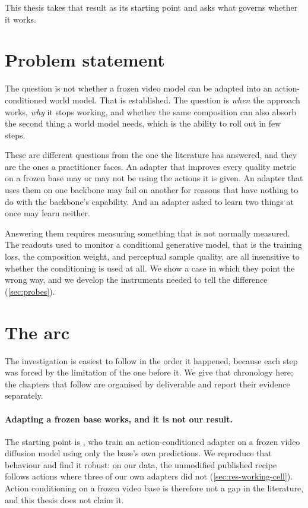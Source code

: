 This thesis takes that result as its starting point and asks what governs
whether it works.

\section{Problem statement}
\label{sec:problem}

The question is not whether a frozen video model can be adapted into an
action-conditioned world model. That is established. The question is
\emph{when} the approach works, \emph{why} it stops working, and whether the
same composition can also absorb the second thing a world model needs, which
is the ability to roll out in few steps.

These are different questions from the one the literature has answered, and
they are the ones a practitioner faces. An adapter that improves every
quality metric on a frozen base may or may not be using the actions it is
given. An adapter that uses them on one backbone may fail on another for
reasons that have nothing to do with the backbone's capability. And an
adapter asked to learn two things at once may learn neither.

Answering them requires measuring something that is not normally measured.
The readouts used to monitor a conditional generative model, that is the
training loss, the composition weight, and perceptual sample quality, are
all insensitive to whether the conditioning is used at all. We show a case
in which they point the wrong way, and we develop the instruments needed to
tell the difference (\cref{sec:probes}).

\section{The arc}
\label{sec:arc}

The investigation is easiest to follow in the order it happened, because
each step was forced by the limitation of the one before it. We give that
chronology here; the chapters that follow are organised by deliverable and
report their evidence separately.

\paragraph{Adapting a frozen base works, and it is not our result.} The
starting point is \citet{rigter2024avid}, who train an
action-conditioned adapter on a frozen video diffusion model using only the
base's own predictions. We reproduce that behaviour and find it robust: on
our data, the unmodified published recipe follows actions where three of our
own adapters did not (\cref{sec:res-working-cell}). Action conditioning on a
frozen video base is therefore not a gap in the literature, and this thesis
does not claim it.

